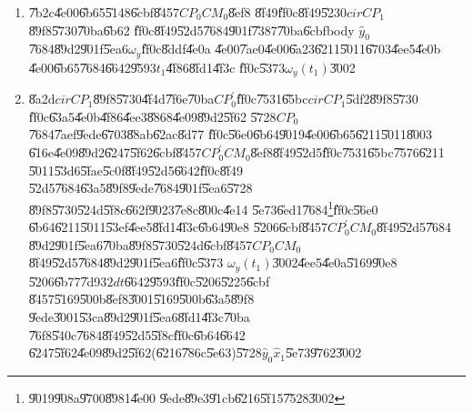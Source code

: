 \documentclass{article}
\begin{document}
\begin{enumerate}
\item \U{7b2c}\U{4e00}\U{6b65}\U{5148}\U{6cbf}\U{8457}$CP_{0}CM_{0}$\U{8ef8}%
\U{8f49}\U{ff0c}\U{8f49}\U{5230}$cirCP_{1}$\U{89f8}\U{5730}\U{70ba}\U{6b62}%
\U{ff0c}\U{8f49}\U{52d5}\U{7684}\U{901f}\U{7387}\U{70ba}\U{6cbf}body $\hat{y}%
_{0}$\U{7684}\U{89d2}\U{901f}\U{5ea6}$\omega _{y}$\U{ff0c}\U{8ddf}\U{4e0a}%
\U{4e00}\U{7ae0}\U{4e00}\U{6a23}\U{6211}\U{5011}\U{6703}\U{4ee5}\U{4e0b}%
\U{4e00}\U{6b65}\U{7684}\U{6642}\U{9593}$t_{1}$\U{4f86}\U{8fd1}\U{4f3c}%
\U{ff0c}\U{5373}$\omega _{y}\left( t_{1}\right) $\U{3002}

\item \U{8a2d}$cirCP_{1}$\U{89f8}\U{5730}\U{4f4d}\U{7f6e}\U{70ba}$%
CP_{0}^{\prime }$\U{ff0c}\U{7531}\U{65bc}$cirCP_{1}$\U{5df2}\U{89f8}\U{5730}%
\U{ff0c}\U{63a5}\U{4e0b}\U{4f86}\U{4ee3}\U{8868}\U{4e09}\U{89d2}\U{5f62}%
\U{5728}$CP_{0}$\U{7684}\U{7aef}\U{9ede}\U{6703}\U{88ab}\U{62ac}\U{8d77}%
\U{ff0c}\U{56e0}\U{6b64}\U{9019}\U{4e00}\U{6b65}\U{6211}\U{5011}\U{8003}%
\U{616e}\U{4e09}\U{89d2}\U{6247}\U{5f62}\U{6cbf}\U{8457}$CP_{0}^{\prime
}CM_{0}$\U{8ef8}\U{8f49}\U{52d5}\U{ff0c}\U{7531}\U{65bc}\U{7576}\U{6211}%
\U{5011}\U{53d6}\U{5fae}\U{5c0f}\U{8f49}\U{52d5}\U{6642}\U{ff0c}\U{8f49}%
\U{52d5}\U{7684}\U{63a5}\U{89f8}\U{9ede}\U{7684}\U{901f}\U{5ea6}\U{5728}%
\U{89f8}\U{5730}\U{524d}\U{5f8c}\U{662f}\U{9023}\U{7e8c}\U{800c}\U{4e14}%
\U{5e73}\U{6ed1}\U{7684}\footnote{\U{9019}\U{908a}\U{9700}\U{8981}\U{4e00}%
\U{9ede}\U{89e3}\U{91cb}\U{6216}\U{5f15}\U{7528}\U{3002}}\U{ff0c}\U{56e0}%
\U{6b64}\U{6211}\U{5011}\U{53ef}\U{4ee5}\U{8fd1}\U{4f3c}\U{6b64}\U{90e8}%
\U{5206}\U{6cbf}\U{8457}$CP_{0}^{\prime }CM_{0}$\U{8f49}\U{52d5}\U{7684}%
\U{89d2}\U{901f}\U{5ea6}\U{70ba}\U{89f8}\U{5730}\U{524d}\U{6cbf}\U{8457}$%
CP_{0}CM_{0}$\U{8f49}\U{52d5}\U{7684}\U{89d2}\U{901f}\U{5ea6}\U{ff0c}\U{5373}%
$\omega _{y}\left( t_{1}\right) $\U{3002}\U{4ee5}\U{4e0a}\U{5169}\U{90e8}%
\U{5206}\U{6b77}\U{7d93}$2dt$\U{6642}\U{9593}\U{ff0c}\U{5206}\U{5225}\U{6cbf}%
\U{8457}\U{5169}\U{500b}\U{8ef8}\U{3001}\U{5169}\U{500b}\U{63a5}\U{89f8}%
\U{9ede}\U{3001}\U{53ca}\U{89d2}\U{901f}\U{5ea6}\U{8fd1}\U{4f3c}\U{70ba}%
\U{76f8}\U{540c}\U{7684}\U{8f49}\U{52d5}\U{5f8c}\U{ff0c}\U{6b64}\U{6642}%
\U{6247}\U{5f62}\U{4e09}\U{89d2}\U{5f62}(\U{6216}\U{786c}\U{5e63})\U{5728}$%
\hat{y}_{0}\hat{x}_{1}$\U{5e73}\U{9762}\U{3002}


\end{enumerate}
\end{document}
